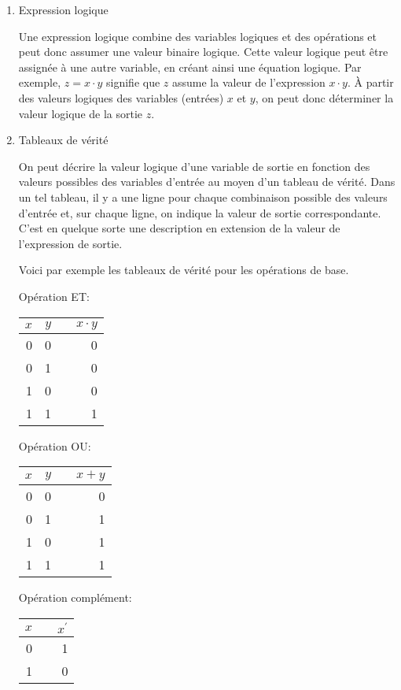 \documentclass[letter, oneside]{book}
\begin{document}
\begin{enumerate}
\item Expression logique
\label{sec:org0b8c370}

Une expression logique combine des variables logiques et des
opérations et peut donc assumer une valeur binaire logique. Cette
valeur logique peut être assignée à une autre variable, en créant
ainsi une équation logique. Par exemple, \(z = x \cdot y\) signifie
que \(z\) assume la valeur de l'expression \(x \cdot y\). À partir des
valeurs logiques des variables (entrées) \(x\) et \(y\), on peut donc
déterminer la valeur logique de la sortie \(z\).

\item Tableaux de vérité
\label{sec:orge534fa4}

On peut décrire la valeur logique d'une variable de sortie en
fonction des valeurs possibles des variables d'entrée au moyen
d'un tableau de vérité. Dans un tel tableau, il y a une ligne pour
chaque combinaison possible des valeurs d'entrée et, sur chaque ligne,
on indique la valeur de sortie correspondante. C'est en quelque sorte
une description en extension de la valeur de l'expression de sortie.

Voici par exemple les tableaux de vérité pour les opérations de base.

Opération ET:

\begin{center}
\begin{tabular}{rrlr}
\(x\) & \(y\) &  & \(x \cdot y\)\\[0pt]
\hline
0 & 0 &  & 0\\[0pt]
0 & 1 &  & 0\\[0pt]
1 & 0 &  & 0\\[0pt]
1 & 1 &  & 1\\[0pt]
\end{tabular}
\end{center}

Opération OU:

\begin{center}
\begin{tabular}{rrlr}
\(x\) & \(y\) &  & \(x + y\)\\[0pt]
\hline
0 & 0 &  & 0\\[0pt]
0 & 1 &  & 1\\[0pt]
1 & 0 &  & 1\\[0pt]
1 & 1 &  & 1\\[0pt]
\end{tabular}
\end{center}

Opération complément:

\begin{center}
\begin{tabular}{rlr}
\(x\) &  & \(x^{\prime}\)\\[0pt]
\hline
0 &  & 1\\[0pt]
1 &  & 0\\[0pt]
\end{tabular}
\end{center}
\end{enumerate}
\end{document}

